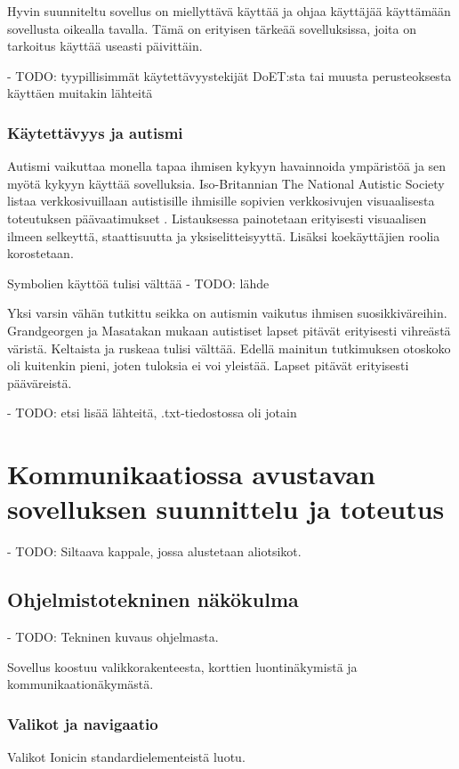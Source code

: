 \documentclass[utf8]{gradu3}
\begin{document}
Hyvin suunniteltu sovellus on miellyttävä käyttää ja ohjaa käyttäjää käyttämään sovellusta oikealla tavalla. Tämä on erityisen tärkeää sovelluksissa, joita on tarkoitus käyttää useasti päivittäin.

- TODO: tyypillisimmät käytettävyystekijät DoET:sta tai muusta perusteoksesta käyttäen muitakin lähteitä

\subsection{Käytettävyys ja autismi}

Autismi vaikuttaa monella tapaa ihmisen kykyyn havainnoida ympäristöä ja sen myötä kykyyn käyttää sovelluksia. Iso-Britannian The National Autistic Society listaa verkkosivuillaan autistisille ihmisille sopivien verkkosivujen visuaalisesta toteutuksen päävaatimukset \parencite[]{autism-friendly-websites}. Listauksessa painotetaan erityisesti visuaalisen ilmeen selkeyttä, staattisuutta ja yksiselitteisyyttä. Lisäksi koekäyttäjien roolia korostetaan.

Symbolien käyttöä tulisi välttää 
- TODO: lähde

Yksi varsin vähän tutkittu seikka on autismin vaikutus ihmisen suosikkiväreihin. Grandgeorgen ja Masatakan \parencite[]{color-preference-autism} mukaan autistiset lapset pitävät erityisesti vihreästä väristä. Keltaista ja ruskeaa tulisi välttää. Edellä mainitun tutkimuksen otoskoko oli kuitenkin pieni, joten tuloksia ei voi yleistää. Lapset pitävät erityisesti pääväreistä.

- TODO: etsi lisää lähteitä, .txt-tiedostossa oli jotain

\chapter{Kommunikaatiossa avustavan sovelluksen suunnittelu ja toteutus}
- TODO: Siltaava kappale, jossa alustetaan aliotsikot.

\section{Ohjelmistotekninen näkökulma}
- TODO: Tekninen kuvaus ohjelmasta.

Sovellus koostuu valikkorakenteesta, korttien luontinäkymistä ja kommunikaationäkymästä.

\subsection{Valikot ja navigaatio}
Valikot
Ionicin standardielementeistä luotu.
\end{document}
